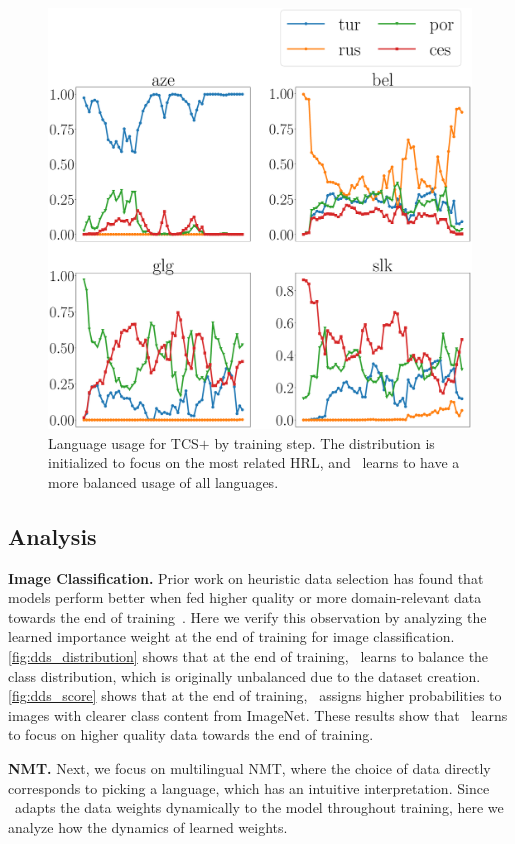 \begin{figure}
    \centering
    \includegraphics[width=0.9\columnwidth]{figs/hs_prob_plot.eps}
    \caption{\label{fig:nmt_distrib_hs}Language usage for TCS$+$\dds{} by training step. The distribution is initialized to focus on the most related HRL, and \dds~learns to have a more balanced usage of all languages.}
\end{figure}

\subsection{Analysis}


\textbf{Image Classification.} Prior work on heuristic data selection has found that models perform better when fed higher quality or more domain-relevant data  towards the end of training~\citep{dynamic_data_selection_nmt,dynamic}. Here we verify this observation by analyzing the learned importance weight at the end of training for image classification. \autoref{fig:dds_distribution} shows that at the end of training, \dds~learns to balance the class distribution, which is originally unbalanced due to the dataset creation. \autoref{fig:dds_score} shows that at the end of training, \dds~assigns higher probabilities to images with clearer class content from ImageNet. These results show that \dds~learns to focus on higher quality data towards the end of training.  


\textbf{NMT.}
Next, we focus on multilingual NMT, where the choice of data directly corresponds to picking a language, which has an intuitive interpretation. Since \dds~adapts the data weights dynamically to the model throughout training, here we analyze how the dynamics of learned weights.


